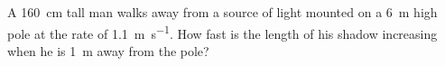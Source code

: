 
%
%
%
%
% 
% 

\question[2] A \SI{160}{\centi\metre} tall man walks away from a source of light 
mounted on a \SI{6}{\meter} high pole at the rate of \SI{1.1}{\meter\per\second}.
How fast is the length of his shadow increasing when he is \SI{1}{\meter} away from the pole?


